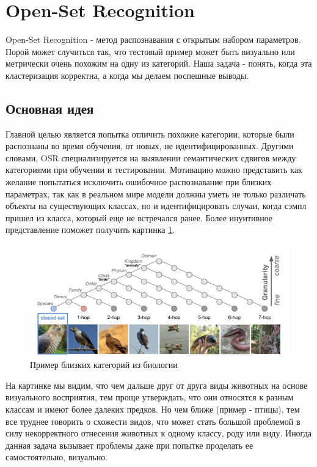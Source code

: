 \section{Open-Set Recognition}

Open-Set Recognition - метод распознавания с открытым набором параметров.
Порой может случиться так, что тестовый пример может быть визуально или метрически очень похожим на одну из категорий.
Наша задача - понять, когда эта кластеризация корректна, а когда мы делаем поспешные выводы.

\subsection{Основная идея}
Главной целью является попытка отличить похожие категории, которые были распознаны во время обучения, от новых, не идентифицированных. 
Другими словами, OSR специализируется на выявлении семантических сдвигов между категориями при обучении и тестировании.
Мотивацию можно представить как желание попытаться исключить ошибочное распознавание при близких параметрах, так как в реальном мире модели должны уметь не только различать объекты на существующих классах, но и идентифицировать случаи, когда сэмпл пришел из класса, который еще не встречался ранее.
Более инуитивное представление поможет получить картинка \ref{fig:anomalies-abstract}.

\begin{figure}[ht]
	\centering
	\includegraphics[width=0.8\linewidth]{chapters/anomalies/images/anomalies-abstract.jpg}
	\caption{Пример близких категорий из биологии}
	\label{fig:anomalies-abstract}
\end{figure}

На картинке мы видим, что чем дальше друг от друга виды животных на основе визуального восприятия, тем проще утверждать, что они относятся к разным классам и имеют более далеких предков.
Но чем ближе (пример - птицы), тем все труднее говорить о схожести видов, что может стать большой проблемой в силу некорректного отнесения животных к одному классу, роду или виду.
Иногда данная задача вызывает проблемы даже при попытке проделать ее самостоятельно, визуально.

